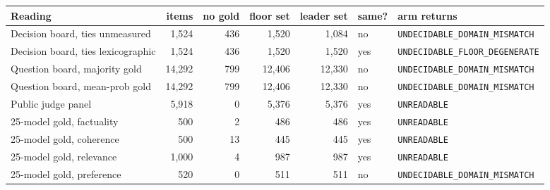\begin{tabular}{lrrrrlp{2.45cm}}
\toprule
Reading & items & no gold & floor set & leader set & same? & arm returns \\
\midrule
Decision board, ties unmeasured & 1,524 & 436 & 1,520 & 1,084 & no & \texttt{UNDECIDABLE\allowbreak\_DOMAIN\allowbreak\_MISMATCH} \\
Decision board, ties lexicographic & 1,524 & 436 & 1,520 & 1,520 & yes & \texttt{UNDECIDABLE\allowbreak\_FLOOR\allowbreak\_DEGENERATE} \\
Question board, majority gold & 14,292 & 799 & 12,406 & 12,330 & no & \texttt{UNDECIDABLE\allowbreak\_DOMAIN\allowbreak\_MISMATCH} \\
Question board, mean-prob gold & 14,292 & 799 & 12,406 & 12,330 & no & \texttt{UNDECIDABLE\allowbreak\_DOMAIN\allowbreak\_MISMATCH} \\
Public judge panel & 5,918 & 0 & 5,376 & 5,376 & yes & \texttt{UNREADABLE} \\
25-model gold, factuality & 500 & 2 & 486 & 486 & yes & \texttt{UNREADABLE} \\
25-model gold, coherence & 500 & 13 & 445 & 445 & yes & \texttt{UNREADABLE} \\
25-model gold, relevance & 1,000 & 4 & 987 & 987 & yes & \texttt{UNREADABLE} \\
25-model gold, preference & 520 & 0 & 511 & 511 & no & \texttt{UNDECIDABLE\allowbreak\_DOMAIN\allowbreak\_MISMATCH} \\
\bottomrule
\end{tabular}
